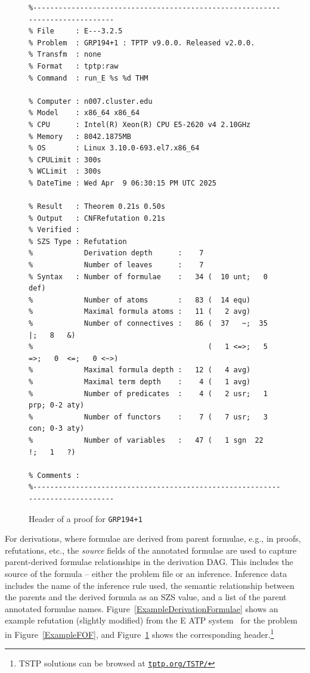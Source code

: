 \documentclass[runningheads]{llncs}
\begin{document}
\begin{figure}[htb]
\centering
{\scriptsize
{\setlength{\baselineskip}{2.5mm}
\begin{verbatim}
%------------------------------------------------------------------------------
% File     : E---3.2.5
% Problem  : GRP194+1 : TPTP v9.0.0. Released v2.0.0.
% Transfm  : none
% Format   : tptp:raw
% Command  : run_E %s %d THM

% Computer : n007.cluster.edu
% Model    : x86_64 x86_64
% CPU      : Intel(R) Xeon(R) CPU E5-2620 v4 2.10GHz
% Memory   : 8042.1875MB
% OS       : Linux 3.10.0-693.el7.x86_64
% CPULimit : 300s
% WCLimit  : 300s
% DateTime : Wed Apr  9 06:30:15 PM UTC 2025

% Result   : Theorem 0.21s 0.50s
% Output   : CNFRefutation 0.21s
% Verified : 
% SZS Type : Refutation
%            Derivation depth      :    7
%            Number of leaves      :    7
% Syntax   : Number of formulae    :   34 (  10 unt;   0 def)
%            Number of atoms       :   83 (  14 equ)
%            Maximal formula atoms :   11 (   2 avg)
%            Number of connectives :   86 (  37   ~;  35   |;   8   &)
%                                         (   1 <=>;   5  =>;   0  <=;   0 <~>)
%            Maximal formula depth :   12 (   4 avg)
%            Maximal term depth    :    4 (   1 avg)
%            Number of predicates  :    4 (   2 usr;   1 prp; 0-2 aty)
%            Number of functors    :    7 (   7 usr;   3 con; 0-3 aty)
%            Number of variables   :   47 (   1 sgn  22   !;   1   ?)

% Comments : 
%------------------------------------------------------------------------------
\end{verbatim}
}}
\caption{Header of a proof for {\tt GRP194+1}}
\label{ExampleDerivationHeader}
\end{figure}

For derivations, where formulae are derived from parent formulae, e.g., in proofs, refutations, 
etc., the {\em source} fields of the annotated formulae are used to capture parent-derived 
formulae relationships in the derivation DAG.
This includes the source of the formula -- either the problem file or an inference.
Inference data includes the name of the inference rule used, the semantic relationship between 
the parents and the derived formula as an SZS value, and a list of the parent annotated formulae 
names.
Figure~\ref{ExampleDerivationFormulae} shows an example refutation (slightly modified) from 
the E ATP system~\cite{SCV19} for the problem in Figure~\ref{ExampleFOF}, and 
Figure~\ref{ExampleDerivationHeader} shows the corresponding header.\footnote{%
TSTP solutions can be browsed at \href{https://tptp.org/TSTP/}{{\tt tptp.org/TSTP/}}}
\end{document}
